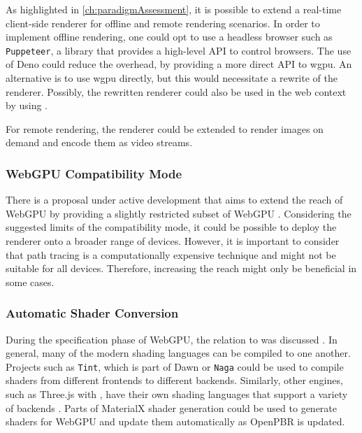 As highlighted in \autoref{ch:paradigmAssessment}, it is possible to extend a real-time client-side renderer for offline and remote rendering scenarios. In order to implement offline rendering, one could opt to use a headless browser such as \texttt{Puppeteer}, a  library that provides a high-level \gls{API} to control browsers. The use of \gls{Deno} could reduce the overhead, by providing a more direct \gls{API} to \gls{wgpu}. An alternative is to use \gls{wgpu} directly, but this would necessitate a rewrite of the renderer. Possibly, the rewritten renderer could also be used in the web context by using .

For remote rendering, the renderer could be extended to render images on demand and encode them as video streams.

\subsubsection*{WebGPU Compatibility Mode}

There is a proposal under active development that aims to extend the reach of \gls{WebGPU} by providing a slightly restricted subset of \gls{WebGPU} \cite{WebGPUCompatibilityModeProposal}. Considering the suggested limits of the compatibility mode, it could be possible to deploy the renderer onto a broader range of devices. However, it is important to consider that path tracing is a computationally expensive technique and might not be suitable for all devices. Therefore, increasing the reach might only be beneficial in some cases.

\subsubsection*{Automatic Shader Conversion}

During the specification phase of \gls{WebGPU}, the relation to  was discussed \cite{webGPUSpirVRelation}. In general, many of the modern shading languages can be compiled to one another. Projects such as \texttt{Tint}, which is part of \gls{Dawn} \cite{dawnImplementation} or \texttt{Naga} \cite{nagaImplementation} could be used to compile shaders from different frontends to different backends. Similarly, other engines, such as \gls{Three.js} with , have their own shading languages that support a variety of backends \cite{ThreeJSShadingLanguage}. Parts of \gls{MaterialX} shader generation could be used to generate shaders for \gls{WebGPU} and update them automatically as \gls{OpenPBR} is updated.

